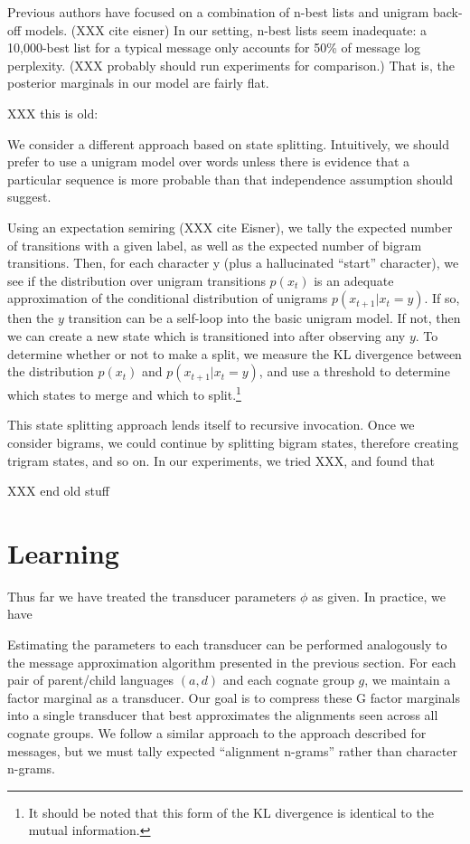 \documentclass[11pt,a4paper]{article}
\begin{document}
Previous authors have focused on a combination of n-best lists and
unigram back-off models. (XXX cite eisner) In our setting, n-best
lists seem inadequate: a 10,000-best list for a typical message
only accounts for 50\% of message log perplexity. (XXX probably
should run experiments for comparison.) That is, the posterior
marginals in our model are fairly flat.

XXX this is old:

We consider a different approach based on state splitting. Intuitively,
we should prefer to use a unigram model over words unless there is
evidence that a particular sequence is more probable than that
independence assumption should suggest.

Using an expectation semiring (XXX cite Eisner), we tally the
expected number of transitions with a given label, as well as the
expected number of bigram transitions. Then, for each character y
(plus a hallucinated ``start'' character), we see if the distribution
over unigram transitions $p(x_t)$ is an adequate approximation of
the conditional distribution of unigrams $p(x_{t+1}|x_t = y)$. If
so, then the $y$ transition can be a self-loop into the basic unigram
model. If not, then we can create a new state which is transitioned
into after observing any $y$. To determine whether or not to make
a split, we measure the KL divergence between the distribution
$p(x_t)$ and $p(x_{t+1}|x_t=y)$, and use a threshold to determine
which states to merge and which to split.\footnote{It should be
noted that this form of the KL divergence is identical to the mutual
information.}

This state splitting approach lends itself to recursive invocation.
Once we consider bigrams, we could continue by splitting bigram
states, therefore creating trigram states, and so on. In our experiments,
we tried XXX, and found that 

XXX end old stuff

\section{Learning}

Thus far we have treated the transducer parameters $\phi$ as given.
In practice, we have  

Estimating the parameters to each transducer can be performed
analogously to the message approximation algorithm presented in the
previous section. For each pair of parent/child languages $(a,d)$
and each cognate group $g$, we maintain a factor marginal as a
transducer. Our goal is to compress these G factor marginals into
a single transducer that best approximates the alignments seen
across all cognate groups. We follow a similar approach to the
approach described for messages, but we must tally expected ``alignment
n-grams'' rather than character n-grams.
\end{document}
